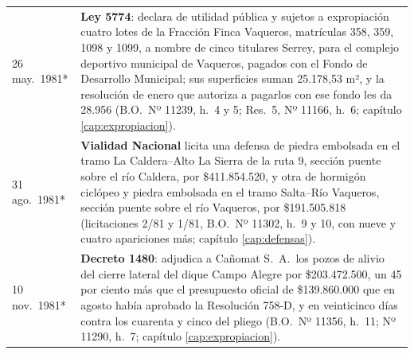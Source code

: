 \begin{longtable}{@{}p{2.7cm}p{10.3cm}@{}}
26 may.\ 1981* & \textbf{Ley 5774}: declara de utilidad pública y sujetos a expropiación cuatro lotes de la Fracción Finca Vaqueros, matrículas 358, 359, 1098 y 1099, a nombre de cinco titulares Serrey, para el complejo deportivo municipal de Vaqueros, pagados con el Fondo de Desarrollo Municipal; sus superficies suman 25.178,53 m², y la resolución de enero que autoriza a pagarlos con ese fondo les da 28.956 (B.O.\ Nº 11239, h.\ 4 y 5; Res.\ 5, Nº 11166, h.\ 6; capítulo \ref{cap:expropiacion}). \\
31 ago.\ 1981* & \textbf{Vialidad Nacional} licita una defensa de piedra embolsada en el tramo La Caldera--Alto La Sierra de la ruta 9, sección puente sobre el río Caldera, por \$411.854.520, y otra de hormigón ciclópeo y piedra embolsada en el tramo Salta--Río Vaqueros, sección puente sobre el río Vaqueros, por \$191.505.818 (licitaciones 2/81 y 1/81, B.O.\ Nº 11302, h.\ 9 y 10, con nueve y cuatro apariciones más; capítulo \ref{cap:defensas}). \\
10 nov.\ 1981* & \textbf{Decreto 1480}: adjudica a Cañomat S.\ A.\ los pozos de alivio del cierre lateral del dique Campo Alegre por \$203.472.500, un 45 por ciento más que el presupuesto oficial de \$139.860.000 que en agosto había aprobado la Resolución 758-D, y en veinticinco días contra los cuarenta y cinco del pliego (B.O.\ Nº 11356, h.\ 11; Nº 11290, h.\ 7; capítulo \ref{cap:expropiacion}). \\

\end{longtable}
